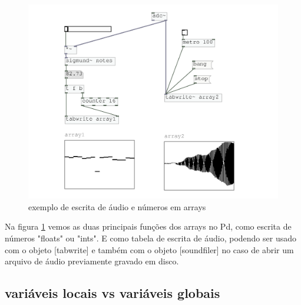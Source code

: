 \documentclass{ppgmus}
\begin{document}
\begin{figure}
\includegraphics[scale=.6]{escrita-array}
\caption{exemplo de escrita de áudio e números em arrays}
\label{escritaarray}
\end{figure}

Na figura \ref{escritaarray} vemos as duas principais funções dos arrays
no Pd, como escrita de números "floats" ou "ints". E como tabela de escrita
de áudio, podendo ser usado com o objeto [tabwrite\texttildelow] e também
com o objeto [soundfiler] no caso de abrir um arquivo de áudio previamente
gravado em disco.







\subsection{variáveis locais vs variáveis globais}
\end{document}

